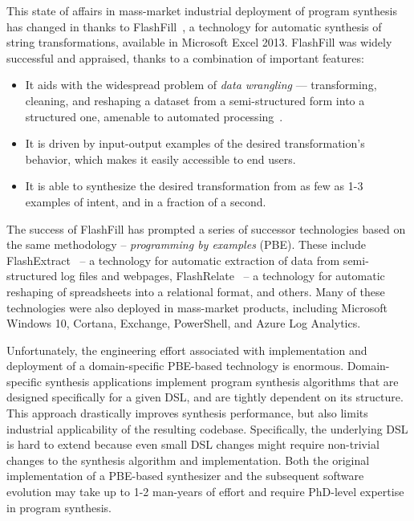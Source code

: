 This state of affairs in mass-market industrial deployment of program synthesis has changed in \citeyear{flashfill}
thanks to FlashFill~\cite{flashfill}, a technology for automatic synthesis of string
transformations, available in Microsoft Excel 2013.
FlashFill was widely successful and appraised, thanks to a combination of important features:
\begin{itemize}[nosep]
    \item It aids with the widespread problem of \emph{data wrangling} --- transforming, cleaning, and reshaping a
        dataset from a semi-structured form into a structured one, amenable to automated
        processing~\cite{kandel2012enterprise}.
    \item It is driven by input-output examples of the desired transformation's behavior, which makes it easily
        accessible to end users.
    \item It is able to synthesize the desired transformation from as few as 1-3 examples of intent, and in a fraction
        of a second.
\end{itemize}

The success of FlashFill has prompted a series of successor technologies based on the same methodology --
\emph{programming by examples} (PBE).
These include FlashExtract~\cite{flashextract} -- a technology for automatic extraction of data from semi-structured log
files and webpages, FlashRelate~\cite{flashrelate} -- a technology for automatic reshaping of spreadsheets into a
relational format, and others.
Many of these technologies were also deployed in mass-market products, including Microsoft Windows 10, Cortana,
Exchange, PowerShell, and Azure Log Analytics.

Unfortunately, the engineering effort associated with implementation and deployment of a domain-specific PBE-based
technology is enormous.
Domain-specific synthesis applications implement program synthesis algorithms that are designed specifically for a given
DSL, and are tightly dependent on its structure.
This approach drastically improves synthesis performance, but also limits industrial applicability of the resulting
codebase.
Specifically, the underlying DSL is hard to extend because even small DSL changes might require non-trivial changes
to the synthesis algorithm and implementation.
Both the original implementation of a PBE-based synthesizer and the subsequent software evolution may take up to 1-2
man-years of effort and require PhD-level expertise in program synthesis.

